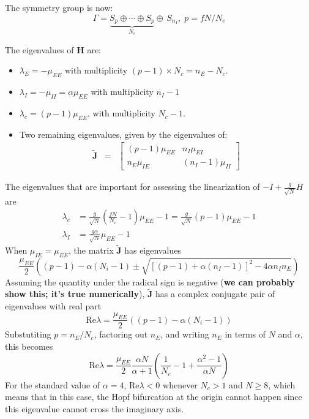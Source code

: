 \documentclass[11pt,reqno]{amsart}
\newcommand{\Hvec}{\mathbf{H}}
\newcommand{\Jvec}{\mathbf{J}}
\begin{document}
The symmetry group is now:
\[ 
\Gamma = \underbrace{S_{p} \oplus \cdots  \oplus S_{p}}_{N_c} \oplus \, S_{n_I}, \; p = fN/N_c \]


The eigenvalues of $\Hvec$ are:
\begin{itemize}
\item $\lambda_E = -\mu_{EE}$ with multiplicity $(p-1) \times N_c = n_E - N_c$.
\item $\lambda_I = -\mu_{II} = \alpha \mu_{EE}$ with multiplicity  $n_I - 1$
\item $\lambda_c = (p-1) \mu_{EE}$, with multiplicity $N_c - 1$.
\item Two remaining eigenvalues, given by the eigenvalues of:
 \begin{eqnarray}
\tilde{\Jvec} & = & \left[  \begin{matrix}
(p-1) \mu_{EE} & n_I \mu_{EI}\\[0.3em]
n_E  \mu_{IE}  & (n_I-1) \mu_{II}
\end{matrix} \right]   
\end{eqnarray}
\end{itemize}


The eigenvalues that are important for assessing the linearization of $-I + \frac{g}{\sqrt{N}} H$ are
\begin{align*}
    \lambda_c &= \frac{g}{\sqrt{N}} \left( \frac{f N}{N_c} - 1  \right)\mu_{EE} - 1 = \frac{g}{\sqrt{N}} \left( p - 1  \right) \mu_{EE} - 1  \\
    \lambda_I &= \frac{g\alpha}{\sqrt{N}} \mu_{EE} - 1
\end{align*}
When $\mu_{IE} = \mu_{EE}$, the matrix $\tilde{\Jvec}$ has eigenvalues
\[
\frac{\mu_{EE}}{2}\left( (p-1) - \alpha(N_i - 1) \pm \sqrt{ \left[ (p-1) +  \alpha(n_I - 1) \right]^2 - 4 \alpha n_I n_E} \right)
\]
Assuming the quantity under the radical sign is negative (\textbf{we can probably show this; it's true numerically}), $\tilde{\Jvec}$ has a complex conjugate pair of eigenvalues with real part
\[
\text{Re} \lambda = \frac{\mu_{EE}}{2}\left( (p-1) - \alpha(N_i - 1) \right)
\]
Substutiting $p = n_E/N_c$, factoring out $n_E$, and writing $n_E$ in terms of $N$ and $\alpha$, this becomes 
\[
\text{Re} \lambda = \frac{\mu_{EE}}{2}
\frac{\alpha N}{\alpha + 1}
\left( \frac{1}{N_c} - 1 + \frac{\alpha^2-1}{\alpha N} \right)
\]
For the standard value of $\alpha = 4$, $\text{Re} \lambda < 0$ whenever $N_c > 1$ and $N \geq 8$, which means that in this case, the Hopf bifurcation at the origin cannot happen since this eigenvalue cannot cross the imaginary axis.
\end{document}
